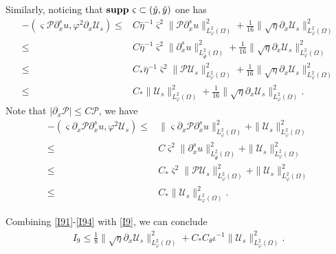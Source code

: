 \documentclass{amsart}
\numberwithin{equation}{section}
\begin{document}
Similarly, noticing that ${\bf supp}~\varsigma\subset(\check{y},\hat{y})$ one has
\begin{align}\label{I93}
-(\varsigma\mathcal{P}\partial_{x}^{s}u,\varphi^{2}\partial_{x}\mathcal{U}_{s})
\leq& C\bar{\eta}^{-1}\bar{\varsigma}^{2}\|\mathcal{P}\partial_{x}^{s}u\|_{L_{\varphi}^{2}(\Omega)}^{2}
     +\frac{1}{16}\|\sqrt{\eta}\partial_{x}\mathcal{U}_{s}\|_{L_{\varphi}^{2}(\Omega)}^{2}\\
\leq& C\bar{\eta}^{-1}\bar{\varsigma}^{2}\|\partial_{x}^{s}u\|_{L_{\hat{\Psi}}^{2}(\Omega)}^{2}
     +\frac{1}{16}\|\sqrt{\eta}\partial_{x}\mathcal{U}_{s}\|_{L_{\varphi}^{2}(\Omega)}^{2}\nonumber\\
\leq& C_{*}\bar{\eta}^{-1}\bar{\varsigma}^{2}\|\mathcal{P}\mathcal{U}_{s}\|_{L_{\varphi}^{2}(\Omega)}^{2}
     +\frac{1}{16}\|\sqrt{\eta}\partial_{x}\mathcal{U}_{s}\|_{L_{\varphi}^{2}(\Omega)}^{2}\nonumber\\
\leq& C_{*}\|\mathcal{U}_{s}\|_{L_{\varphi}^{2}(\Omega)}^{2}
     +\frac{1}{16}\|\sqrt{\eta}\partial_{x}\mathcal{U}_{s}\|_{L_{\varphi}^{2}(\Omega)}^{2}.\nonumber
\end{align}
Note that $|\partial_{x}\mathcal{P}|\leq C\mathcal{P}$, we have
\begin{align}\label{I94}
-(\varsigma\partial_{x}\mathcal{P}\partial_{x}^{s}u,\varphi^{2}\mathcal{U}_{s})
\leq& \|\varsigma\partial_{x}\mathcal{P}\partial_{x}^{s}u\|_{L_{\varphi}^{2}(\Omega)}^{2}
     +\|\mathcal{U}_{s}\|_{L_{\varphi}^{2}(\Omega)}^{2}\\
\leq& C\bar{\varsigma}^{2}\|\partial_{x}^{s}u\|_{L_{\hat{\Psi}}^{2}(\Omega)}^{2}
     +\|\mathcal{U}_{s}\|_{L_{\varphi}^{2}(\Omega)}^{2}\nonumber\\
\leq& C_{*}\bar{\varsigma}^{2}\|\mathcal{P}\mathcal{U}_{s}\|_{L_{\varphi}^{2}(\Omega)}^{2}
     +\|\mathcal{U}_{s}\|_{L_{\varphi}^{2}(\Omega)}^{2}\nonumber\\
\leq& C_{*}\|\mathcal{U}_{s}\|_{L_{\varphi}^{2}(\Omega)}^{2}.\nonumber
\end{align}

Combining \eqref{I91}-\eqref{I94} with \eqref{I9}, we can conclude
\begin{align*}
I_{9}
\leq \frac{1}{8}\|\sqrt{\eta}\partial_{x}\mathcal{U}_{s}\|_{L_{\varphi}^{2}(\Omega)}^{2}
    +C_{*}C_{\theta}\iota^{-1}\|\mathcal{U}_{s}\|_{L_{\varphi}^{2}(\Omega)}^{2}.
\end{align*}
\end{document}
